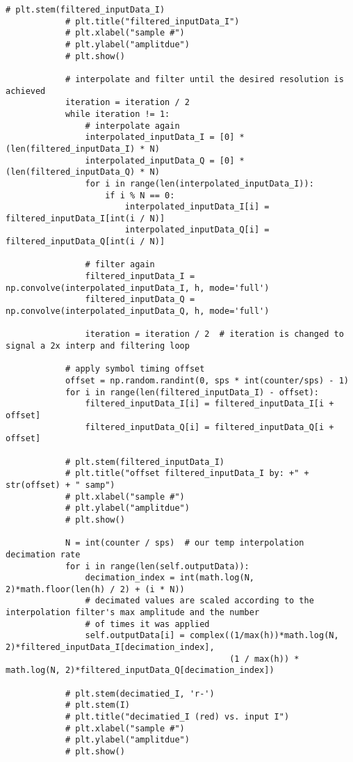 \begin{lstlisting}[breaklines]
            # plt.stem(filtered_inputData_I)
            # plt.title("filtered_inputData_I")
            # plt.xlabel("sample #")
            # plt.ylabel("amplitdue")
            # plt.show()

            # interpolate and filter until the desired resolution is achieved
            iteration = iteration / 2
            while iteration != 1:
                # interpolate again
                interpolated_inputData_I = [0] * (len(filtered_inputData_I) * N)
                interpolated_inputData_Q = [0] * (len(filtered_inputData_Q) * N)
                for i in range(len(interpolated_inputData_I)):
                    if i % N == 0:
                        interpolated_inputData_I[i] = filtered_inputData_I[int(i / N)]
                        interpolated_inputData_Q[i] = filtered_inputData_Q[int(i / N)]

                # filter again
                filtered_inputData_I = np.convolve(interpolated_inputData_I, h, mode='full')
                filtered_inputData_Q = np.convolve(interpolated_inputData_Q, h, mode='full')

                iteration = iteration / 2  # iteration is changed to signal a 2x interp and filtering loop

            # apply symbol timing offset
            offset = np.random.randint(0, sps * int(counter/sps) - 1)
            for i in range(len(filtered_inputData_I) - offset):
                filtered_inputData_I[i] = filtered_inputData_I[i + offset]
                filtered_inputData_Q[i] = filtered_inputData_Q[i + offset]

            # plt.stem(filtered_inputData_I)
            # plt.title("offset filtered_inputData_I by: +" + str(offset) + " samp")
            # plt.xlabel("sample #")
            # plt.ylabel("amplitdue")
            # plt.show()

            N = int(counter / sps)  # our temp interpolation decimation rate
            for i in range(len(self.outputData)):
                decimation_index = int(math.log(N, 2)*math.floor(len(h) / 2) + (i * N))
                # decimated values are scaled according to the interpolation filter's max amplitude and the number
                # of times it was applied
                self.outputData[i] = complex((1/max(h))*math.log(N, 2)*filtered_inputData_I[decimation_index],
                                             (1 / max(h)) * math.log(N, 2)*filtered_inputData_Q[decimation_index])

            # plt.stem(decimatied_I, 'r-')
            # plt.stem(I)
            # plt.title("decimatied_I (red) vs. input I")
            # plt.xlabel("sample #")
            # plt.ylabel("amplitdue")
            # plt.show()
\end{lstlisting}

